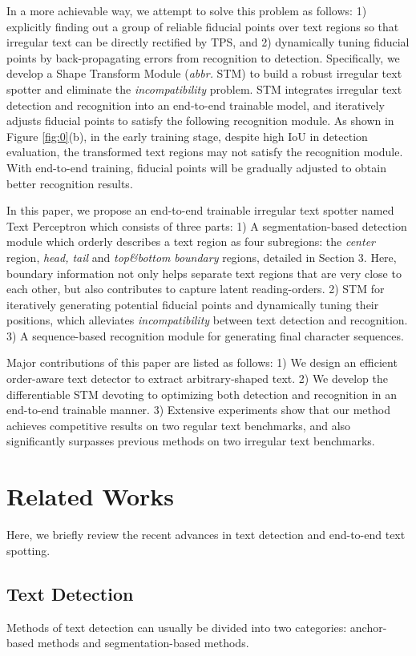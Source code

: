 \documentclass[letterpaper]{article} \usepackage{aaai20}  \usepackage{times}  \usepackage{helvet} \usepackage{courier}  \usepackage[hyphens]{url}  \usepackage{graphicx} \urlstyle{rm} \def\UrlFont{\rm}  \usepackage{graphicx}  \frenchspacing  \setlength{\pdfpagewidth}{8.5in}  \setlength{\pdfpageheight}{11in}  \usepackage{amsmath}
\begin{document}
In a more achievable way, we attempt to solve this problem as follows: 1) explicitly finding out a group of reliable fiducial points over text regions so that irregular text can be directly rectified by TPS, and 2) dynamically tuning fiducial points by back-propagating errors from recognition to detection.
Specifically, we develop a Shape Transform Module (\emph{abbr.} STM) to build a robust irregular text spotter and eliminate the \emph{incompatibility} problem.
STM integrates irregular text detection and recognition into an end-to-end trainable model, and iteratively adjusts fiducial points to satisfy the following recognition module.
As shown in Figure \ref{fig:0}(b), in the early training stage, despite high IoU in detection evaluation, the transformed text regions may not satisfy the recognition module.
With end-to-end training, fiducial points will be gradually adjusted to obtain better recognition results.

In this paper, we propose an end-to-end trainable irregular text spotter named Text Perceptron which consists of three parts:
1) A segmentation-based detection module which orderly describes a text region as four subregions: the \emph{center} region, \emph{head, tail} and \emph{top\&bottom} \emph{boundary} regions, detailed in Section 3. Here, boundary information not only helps separate text regions that are very close to each other, but also contributes to capture latent reading-orders.
2) STM for iteratively generating potential fiducial points and dynamically tuning their positions, which alleviates \emph{incompatibility} between text detection and recognition.
3) A sequence-based recognition module for generating final character sequences.


Major contributions of this paper are listed as follows:
1) We design an efficient order-aware text detector to extract arbitrary-shaped text.
2) We develop the differentiable STM devoting to optimizing both detection and recognition in an end-to-end trainable manner.
3) Extensive experiments show that our method achieves competitive results on two regular text benchmarks, and also significantly surpasses previous methods on two irregular text benchmarks.


\section{Related Works}
Here, we briefly review the recent advances in text detection and end-to-end text spotting.
\subsection{Text Detection}
Methods of text detection can usually be divided into two categories: anchor-based methods and segmentation-based methods.
\end{document}
